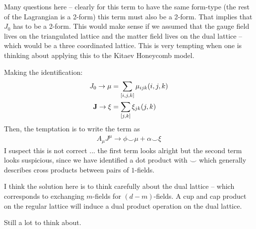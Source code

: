 \documentclass[11pt, oneside]{article} %
\numberwithin{equation}{section}
\begin{document}
\begin{incorrect}
    Many questions here -- clearly for this term to have the same form-type (the rest of the Lagrangian is a 2-form) this term must also be a 2-form. That implies that $J_0$ has to be a 2-form. This would make sense if we assumed that the gauge field lives on the triangulated lattice and the matter field lives on the dual lattice -- which would be a three coordinated lattice. This is very tempting when one is thinking about applying this to the Kitaev Honeycomb model.

    Making the identification:
    \begin{align}
        J_0 \rightarrow \mu &= \sum_{[i,j,k]}\mu_{ijk}(i,j,k) \\
        \textbf J \rightarrow \xi &= \sum_{[j,k]}\xi_{jk} (j,k)
    \end{align}
    Then, the temptation is to write the term as 
    \begin{align}
        A_\mu J^\mu \rightarrow \phi \smile \mu + \alpha \smile \xi
    \end{align}
    I suspect this is not correct ... the first term looks alright but the second term looks suspicious, since we have identified a dot product with $\smile$ which generally describes cross products between pairs of $1$-fields. 

    I think the solution here is to think carefully about the dual lattice -- which corresponds to exchanging $m$-fields for $(d-m)$-fields. A cup and cap product on the regular lattice will induce a dual product operation on the dual lattice. 

    Still a lot to think about.
    
\end{incorrect}

\printbibliography


\end{document}
